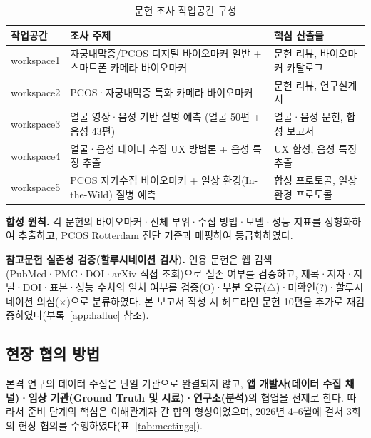 \documentclass[11pt,a4paper]{article}
\begin{document}
\begin{table}[h]
\centering
\footnotesize
\renewcommand{\arraystretch}{1.25}
\caption{문헌 조사 작업공간 구성}
\label{tab:workspace}
\begin{tabularx}{\textwidth}{@{}p{1.9cm} L p{4.0cm}@{}}
\toprule
\textbf{작업공간} & \textbf{조사 주제} & \textbf{핵심 산출물} \\
\midrule
workspace1 & 자궁내막증/PCOS 디지털 바이오마커 일반 + 스마트폰 카메라 바이오마커 & 문헌 리뷰, 바이오마커 카탈로그 \\
workspace2 & PCOS·자궁내막증 특화 카메라 바이오마커 & 문헌 리뷰, 연구설계서 \\
workspace3 & 얼굴 영상·음성 기반 질병 예측 (얼굴 50편 + 음성 43편) & 얼굴·음성 문헌, 합성 보고서 \\
workspace4 & 얼굴·음성 데이터 수집 UX 방법론 + 음성 특징 추출 & UX 합성, 음성 특징 추출 \\
workspace5 & PCOS 자가수집 바이오마커 + 일상 환경(In-the-Wild) 질병 예측 & 합성 프로토콜, 일상환경 프로토콜 \\
\bottomrule
\end{tabularx}
\end{table}

\noindent\textbf{합성 원칙.} 각 문헌의 바이오마커·신체 부위·수집 방법·모델·성능 지표를 정형화하여 추출하고, PCOS Rotterdam 진단 기준과 매핑하여 등급화하였다.

\smallskip
\noindent\textbf{참고문헌 실존성 검증(할루시네이션 검사).} 인용 문헌은 웹 검색(PubMed·PMC·DOI·arXiv 직접 조회)으로 실존 여부를 검증하고, 제목·저자·저널·DOI·표본·성능 수치의 일치 여부를 검증(O)·부분 오류($\triangle$)·미확인(?)·할루시네이션 의심($\times$)으로 분류하였다. 본 보고서 작성 시 헤드라인 문헌 10편을 추가로 재검증하였다(부록~\ref{app:halluc} 참조).

\subsection{현장 협의 방법}
본격 연구의 데이터 수집은 단일 기관으로 완결되지 않고, \textbf{앱 개발사(데이터 수집 채널)·임상 기관(Ground Truth 및 시료)·연구소(분석)}의 협업을 전제로 한다. 따라서 준비 단계의 핵심은 이해관계자 간 합의 형성이었으며, 2026년 4{--}6월에 걸쳐 3회의 현장 협의를 수행하였다(표~\ref{tab:meetings}).
\end{document}
